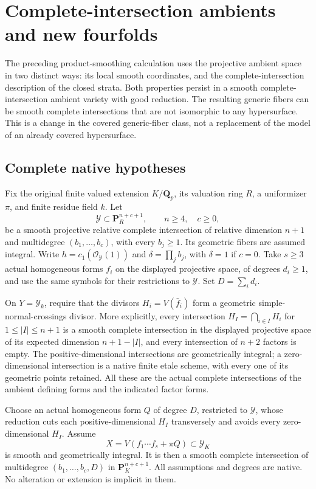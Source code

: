 \section{Complete-intersection ambients and new fourfolds}
\label{r18ca:section}

The preceding product-smoothing calculation uses the projective
ambient space in two distinct ways: its local smooth coordinates,
and the complete-intersection description of the closed strata.
Both properties persist in a smooth complete-intersection ambient
variety with good reduction.  The resulting generic fibers can be
smooth complete intersections that are not isomorphic to any
hypersurface.  This is a change in the covered generic-fiber class,
not a replacement of the model of an already covered hypersurface.

\subsection{Complete native hypotheses}

Fix the original finite valued extension $K/\mathbf Q_p$, its
valuation ring $R$, a uniformizer $\pi$, and finite residue field
$k$.  Let
\[
 \mathcal Y\subset\mathbf P_R^{n+c+1},\qquad n\ge4,\quad c\ge0,
 \tag{CA18.1}\label{r18ca:ambient}
\]
be a smooth projective relative complete intersection of relative
dimension $n+1$ and multidegree $(b_1,\ldots,b_c)$, with every
$b_j\ge1$.  Its geometric fibers are assumed integral.
Write $h=c_1(\mathcal O_{\mathcal Y}(1))$ and
$\delta=\prod_j b_j$, with $\delta=1$ if $c=0$.
Take $s\ge3$ actual homogeneous forms $f_i$ on the displayed
projective space, of degrees $d_i\ge1$, and use the same
symbols for their restrictions to $\mathcal Y$.
Set $D=\sum_i d_i$.

On $Y=\mathcal Y_k$, require that the divisors
$H_i=V(\bar f_i)$ form a geometric simple-normal-crossings
divisor.  More explicitly, every intersection
$H_I=\bigcap_{i\in I}H_i$ for $1\le |I|\le n+1$ is a
smooth complete intersection in the displayed projective space
of its expected dimension $n+1-|I|$, and every intersection of
$n+2$ factors is empty.  The positive-dimensional intersections
are geometrically integral; a zero-dimensional intersection is
a native finite etale scheme, with every one of its geometric
points retained.  All these are the actual complete intersections
of the ambient defining forms and the indicated factor forms.

Choose an actual homogeneous form $Q$ of degree $D$, restricted
to $\mathcal Y$, whose reduction cuts each positive-dimensional $H_I$ transversely
and avoids every zero-dimensional $H_I$.  Assume
\[
       X=V\!\left(f_1\cdots f_s+\pi Q\right)\subset\mathcal Y_K
 \tag{CA18.2}\label{r18ca:generic}
\]
is smooth and geometrically integral.
It is then a smooth complete intersection of multidegree
$(b_1,\ldots,b_c,D)$ in $\mathbf P_K^{n+c+1}$.
All assumptions and degrees are native.  No alteration or
extension is implicit in them.

